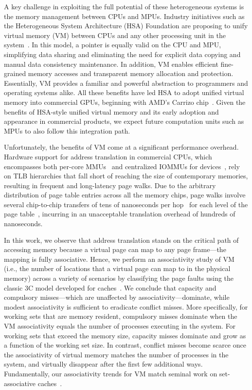 A key challenge in exploiting the full potential of these heterogeneous systems is the memory management between CPUs and MPUs. Industry initiatives such as the Heterogeneous System Architecture (HSA) Foundation are proposing to unify virtual memory (VM) between CPUs and any other processing unit in the system~\cite{hsa}. In this model, a pointer is equally valid on the CPU and MPU, simplifying data sharing and eliminating the need for explicit data copying and manual data consistency maintenance. In addition, VM enables efficient fine-grained memory accesses and transparent memory allocation and protection. Essentially, VM provides a familiar and powerful abstraction to programmers and operating systems alike. All these benefits have led HSA to adopt unified virtual memory into commercial GPUs, beginning with AMD's Carrizo chip~\cite{wilcox:28nm}. Given the benefits of HSA-style unified virtual memory and its early adoption and appearance in commercial products, we expect future computation units such as MPUs to also follow this integration path.

Unfortunately, the benefits of VM come at a significant performance overhead. Hardware support for address translation in commercial CPUs, which encompasses both per-core MMUs~\cite{intel:tlbs} and centralized IOMMUs for devices~\cite{intel:intel}, rely on TLB hierarchies that fall short of reaching the size of contemporary memories, resulting in frequent and long-latency page walks. Due to the arbitrary distribution of page table entries across all the memory chips, page walks involve several chip-to-chip transfers of tens of nanoseconds per hop~\cite{huang:c3d, kanter:cavium, towles:unifying} for each level of the page table~\cite{gantz:hybrid}, incurring in an unacceptable translation overhead of hundreds of nanoseconds. 

In this work, we observe that address translation stands on the critical path of accessing memory because a virtual page can map to any page frame---the mapping is fully associative. Hence, we perform an associativity study of VM (i.e., the number of locations that a virtual page can map to in the physical memory) across a variety of scenarios by classifying the page faults using the classic 3C model developed for caches~\cite{hill:aspects}. We conclude that capacity and compulsory misses---which are unaffected by associativity---dominate, while modest associativity is sufficient to eradicate conflict misses. More specifically, for working sets that are memory resident, compulsory misses dominate when the VM associativity equals the number of processes executing in the system. For working sets that exceed the memory size, capacity misses dominate and grow as a function of the working set size. In contrast, conflict misses become scarce once the associativity of virtual memory matches the number of processes in the system, and virtually disappear after the first few additional ways. Fundamentally, our associativity trends for VM match seminal work on set-associative caches~\cite{hill:aspects, cantin:cache}. 

